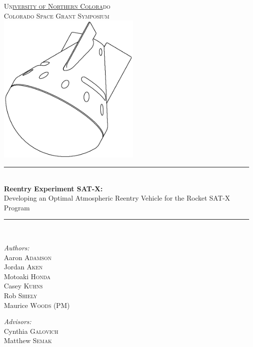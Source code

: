 \documentclass{article}
\newcommand{\HRule}{\rule{\linewidth}{0.5mm}}
\begin{document}
	\begin{titlepage}
		\begin{center}
			\textsc{\LARGE Un\underline{iversity of Northern Colora}do}\\[0.7cm]
			\textsc{\Large Colorado Space Grant Symposium}\\[0.7cm]
			\includegraphics[width=7cm]{CapsuleDrawing}\\[1cm]
			\HRule \\[0.4cm]
			{ \huge \bfseries Reentry Experiment SAT-X:\\} \large Developing an Optimal Atmospheric Reentry Vehicle for the Rocket SAT-X Program\\[0.4cm]
			\HRule \\[1.3cm]
				\begin{minipage}{0.4\textwidth}
					\begin{flushleft} \large
						\emph{Authors:}\\
						Aaron \textsc{Adamson}\\
						Jordan \textsc{Aken}\\
						Motoaki \textsc{Honda}\\
						Casey \textsc{Kuhns}\\
						Rob \textsc{Shiely}\\
						Maurice \textsc{Woods} (PM)
					\end{flushleft}
				\end{minipage}
				\begin{minipage}{0.4\textwidth}
					\begin{flushright} \large
						\emph{Advisors:} \\
						Cynthia \textsc{Galovich}\\
						Matthew \textsc{Semak}\\

\end{flushright}
\end{minipage}
\end{center}
\end{titlepage}
\end{document}
